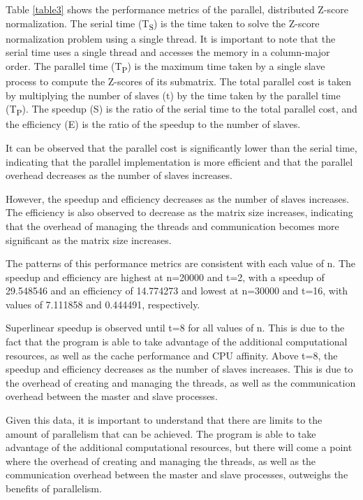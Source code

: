 \documentclass[journal]{./IEEE/IEEEtran}
\begin{document}
Table \ref{table3} shows the performance metrics of the parallel, distributed Z-score normalization. The serial time (T\textsubscript{S}) is the time taken to solve the Z-score normalization problem using a single thread. It is important to note that the serial time uses a single thread and accesses the memory in a column-major order. The parallel time (T\textsubscript{P}) is the maximum time taken by a single slave process to compute the Z-scores of its submatrix. The total parallel cost is taken by multiplying the number of slaves (t) by the time taken by the parallel time (T\textsubscript{P}). The speedup (S) is the ratio of the serial time to the total parallel cost, and the efficiency (E) is the ratio of the speedup to the number of slaves.

It can be observed that the parallel cost is significantly lower than the serial time, indicating that the parallel implementation is more efficient and that the parallel overhead decreases as the number of slaves increases. 

However, the speedup and efficiency decreases as the number of slaves increases. The efficiency is also observed to decrease as the matrix size increases, indicating that the overhead of managing the threads and communication becomes more significant as the matrix size increases.

The patterns of this performance metrics are consistent with each value of n. The speedup and efficiency are highest at n=20000 and t=2, with a speedup of 29.548546 and an efficiency of 14.774273 and lowest at n=30000 and t=16, with values of 7.111858 and 0.444491, respectively.

Superlinear speedup is observed until t=8 for all values of n. This is due to the fact that the program is able to take advantage of the additional computational resources, as well as the cache performance and CPU affinity. Above t=8, the speedup and efficiency decreases as the number of slaves increases. This is due to the overhead of creating and managing the threads, as well as the communication overhead between the master and slave processes.

Given this data, it is important to understand that there are limits to the amount of parallelism that can be achieved. The program is able to take advantage of the additional computational resources, but there will come a point where the overhead of creating and managing the threads, as well as the communication overhead between the master and slave processes, outweighs the benefits of parallelism.
\end{document}
